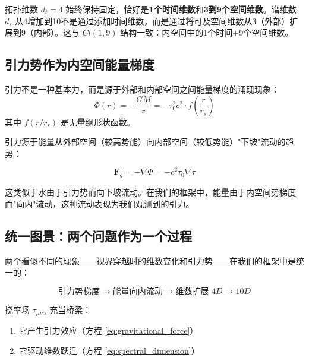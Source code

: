 \begin{remark}[固定时间维数]
拓扑维数 $d_t = 4$ 始终保持固定，恰好是\textbf{1个时间维数}和\textbf{3到9个空间维数}。谱维数 $d_s$ 从4增加到10不是通过添加时间维数，而是通过将可及空间维数从3（外部）扩展到9（内部）。这与 $Cl(1,9)$ 结构一致：内空间中的1个时间+9个空间维数。
\end{remark}

\subsection{引力势作为内空间能量梯度}

\begin{hypothesis}[引力作为内空间势]
引力不是一种基本力，而是源于外部和内部空间之间能量梯度的涌现现象：
\begin{equation}
    \Phi(r) = -\frac{GM}{r} = -\tau_0^2 c^2 \cdot f\left(\frac{r}{r_s}\right)
    \label{eq:gravity_as_potential}
\end{equation}
其中 $f(r/r_s)$ 是无量纲形状函数。
\end{hypothesis}

引力源于能量从外部空间（较高势能）向内部空间（较低势能）"下坡"流动的趋势：

\begin{equation}
    \mathbf{F}_g = -\nabla\Phi = -c^2 \tau_0 \nabla\tau
    \label{eq:gravitational_force}
\end{equation}

\begin{remark}[物理类比]
这类似于水由于引力势而向下坡流动。在我们的框架中，能量由于内空间势梯度而"向内"流动，这种流动表现为我们观测到的引力。
\end{remark}

\subsection{统一图景：两个问题作为一个过程}

两个看似不同的现象——视界穿越时的维数变化和引力势——在我们的框架中是统一的：

\begin{equation}
    \text{引力势梯度} \to \text{能量向内流动} \to \text{维数扩展 } 4D \to 10D
    \label{eq:unified_process}
\end{equation}

挠率场 $\tau_{\mu\nu\alpha}$ 充当桥梁：
\begin{enumerate}
    \item 它产生引力效应（方程 \eqref{eq:gravitational_force}）
    \item 它驱动维数跃迁（方程 \eqref{eq:spectral_dimension}）
\end{enumerate}

